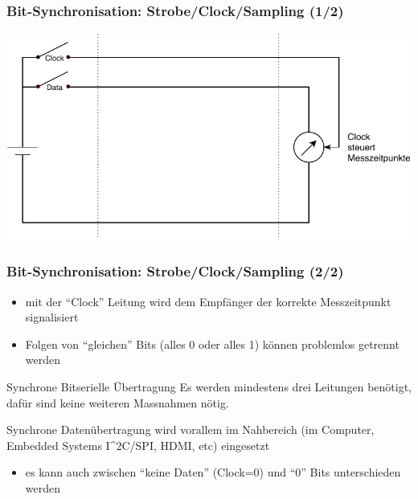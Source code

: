 \documentclass[ignorenonframetext]{beamer}
\begin{document}
\begin{frame}
\frametitle{Bit-Synchronisation: Strobe/Clock/Sampling (1/2)}
\includegraphics{simplest-serial-clock}
\end{frame}


\begin{frame}
\frametitle{Bit-Synchronisation: Strobe/Clock/Sampling (2/2)}
\begin{itemize}
  \item mit der ``Clock'' Leitung wird dem Empf\"anger der korrekte Messzeitpunkt signalisiert
  \item Folgen von ``gleichen'' Bits (alles 0 oder alles 1) k\"onnen problemlos getrennt werden
\end{itemize}
\begin{block}{Synchrone Bitserielle \"Ubertragung}
Es werden mindestens drei Leitungen ben\"otigt, daf\"ur sind keine weiteren Massnahmen n\"otig.

Synchrone Daten\"ubertragung wird vorallem im Nahbereich (im Computer, Embedded Systems I^{2}C/SPI, HDMI, etc) eingesetzt
\end{block}
\begin{itemize}
  \item es kann auch zwischen ``keine Daten'' (Clock=0) und ``0'' Bits unterschieden werden
\end{itemize}
\end{frame}
\end{document}
